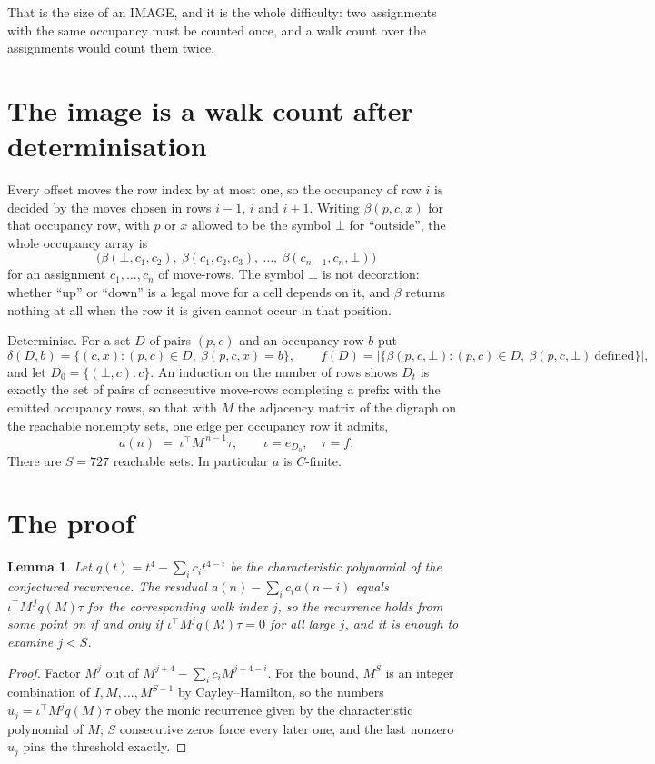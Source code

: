 \documentclass[11pt,a4paper]{article}
\theoremstyle{plain}
\newtheorem{lemma}[theorem]{Lemma}
\theoremstyle{definition}
\begin{document}
That is the size of an IMAGE, and it is the whole difficulty: two assignments with the same
occupancy must be counted once, and a walk count over the assignments would count them twice.

\section{The image is a walk count after determinisation}

Every offset moves the row index by at most one, so the occupancy of row $i$ is decided by the
moves chosen in rows $i-1$, $i$ and $i+1$. Writing $\beta(p,c,x)$ for that occupancy row, with
$p$ or $x$ allowed to be the symbol $\bot$ for ``outside'', the whole occupancy array is
\[
\bigl(\beta(\bot,c_1,c_2),\ \beta(c_1,c_2,c_3),\ \dots,\ \beta(c_{n-1},c_n,\bot)\bigr)
\]
for an assignment $c_1,\dots,c_n$ of move-rows. The symbol $\bot$ is not decoration: whether
``up'' or ``down'' is a legal move for a cell depends on it, and $\beta$ returns nothing at all
when the row it is given cannot occur in that position.

Determinise. For a set $D$ of pairs $(p,c)$ and an occupancy row $b$ put
\[
\delta(D,b)=\{(c,x):(p,c)\in D,\ \beta(p,c,x)=b\},\qquad
f(D)=\bigl|\{\beta(p,c,\bot):(p,c)\in D,\ \beta(p,c,\bot)\ \text{defined}\}\bigr| ,
\]
and let $D_0=\{(\bot,c):c\}$. An induction on the number of rows shows $D_t$ is exactly the
set of pairs of consecutive move-rows completing a prefix with the emitted occupancy rows, so
that with $M$ the adjacency matrix of the digraph on the reachable nonempty sets, one edge per
occupancy row it admits,
\[
a(n)\;=\;\iota^{\!\top}M^{\,n-1}\tau,\qquad \iota=e_{D_0},\quad \tau=f .
\]
There are $S=727$ reachable sets. In particular $a$ is $C$-finite.

\section{The proof}

\begin{lemma}\label{lem:crit}
Let $q(t)=t^{4}-\sum_i c_it^{4-i}$ be the characteristic polynomial of the
conjectured recurrence. The residual $a(n)-\sum_ic_ia(n-i)$ equals
$\iota^{\!\top}M^{\,j}q(M)\tau$ for the corresponding walk index $j$, so the recurrence
holds from some point on if and only if $\iota^{\!\top}M^{j}q(M)\tau=0$ for all large $j$,
and it is enough to examine $j<S$.
\end{lemma}

\begin{proof}
Factor $M^{j}$ out of $M^{j+4}-\sum_ic_iM^{j+4-i}$. For the bound, $M^{S}$
is an integer combination of $I,M,\dots,M^{S-1}$ by Cayley--Hamilton, so the numbers
$u_j=\iota^{\!\top}M^{j}q(M)\tau$ obey the monic recurrence given by the characteristic
polynomial of $M$; $S$ consecutive zeros force every later one, and the last nonzero $u_j$
pins the threshold exactly.
\end{proof}
\end{document}
